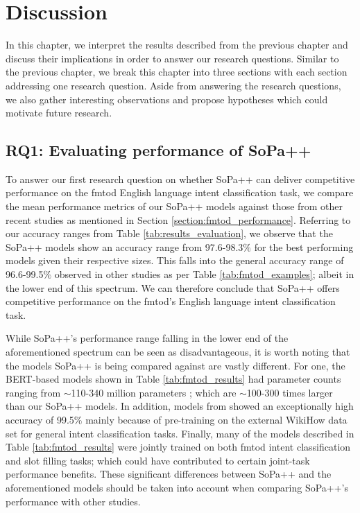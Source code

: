 \chapter{Discussion}

\label{chapter:discussion}

In this chapter, we interpret the results described from the previous chapter
and discuss their implications in order to answer our research questions.
Similar to the previous chapter, we break this chapter into three sections with
each section addressing one research question. Aside from answering the research
questions, we also gather interesting observations and propose hypotheses which could
motivate future research.

\section{RQ1: Evaluating performance of SoPa++}

To answer our first research question on whether SoPa++ can deliver competitive
performance on the \ac{fmtod} English language intent classification task, we compare
the mean performance metrics of our SoPa++ models against those from other
recent studies as mentioned in Section \ref{section:fmtod_performance}.
Referring to our accuracy ranges from Table \ref{tab:results_evaluation}, we
observe that the SoPa++ models show an accuracy range from 97.6-98.3$\%$ for the
best performing models given their respective sizes. This falls into the general
accuracy range of 96.6-99.5$\%$ observed in other studies as per Table
\ref{tab:fmtod_examples}; albeit in the lower end of this spectrum. We can
therefore conclude that SoPa++ offers competitive performance on the \ac{fmtod}'s
English language intent classification task.

While SoPa++'s performance range falling in the lower end of the aforementioned
spectrum can be seen as disadvantageous, it is worth noting that the models
SoPa++ is being compared against are vastly different. For one, the BERT-based
models shown in Table \ref{tab:fmtod_results} had parameter counts ranging from
$\sim$110-340 million parameters \citep{devlin-etal-2019-bert}; which are
$\sim$100-300 times larger than our SoPa++ models. In addition, models from
\citet{zhang-etal-2020-intent} showed an exceptionally high accuracy of 99.5$\%$
mainly because of pre-training on the external WikiHow data set for general
intent classification tasks. Finally, many of the models described in Table
\ref{tab:fmtod_results} were jointly trained on both \ac{fmtod} intent classification
and slot filling tasks; which could have contributed to certain joint-task
performance benefits. These significant differences between SoPa++ and the
aforementioned models should be taken into account when comparing SoPa++'s
performance with other studies. 

